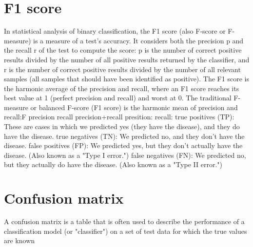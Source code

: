 \section{F1 score}
In statistical analysis of binary classification, the F1 score (also F-score or F-measure) is a measure of a test's accuracy. It considers both the precision p and the recall r of the test to compute the score: p is the number of correct positive results divided by the number of all positive results returned by the classifier, and r is the number of correct positive results divided by the number of all relevant samples (all samples that should have been identified as positive). The F1 score is the harmonic average of the precision and recall, where an F1 score reaches its best value at 1 (perfect precision and recall) and worst at 0.
The traditional F-measure or balanced F-score (F1 score) is the harmonic mean of precision and recall:F precision recall precision+recall
presition:
recall:
true positives (TP): These are cases in which we predicted yes (they have the disease), and they do have the disease.
true negatives (TN): We predicted no, and they don't have the disease.
false positives (FP): We predicted yes, but they don't actually have the disease. (Also known as a "Type I error.")
false negatives (FN): We predicted no, but they actually do have the disease. (Also known as a "Type II error.")


\section{Confusion matrix}
A confusion matrix is a table that is often used to describe the performance of a classification model (or "classifier") on a set of test data for which the true values are known